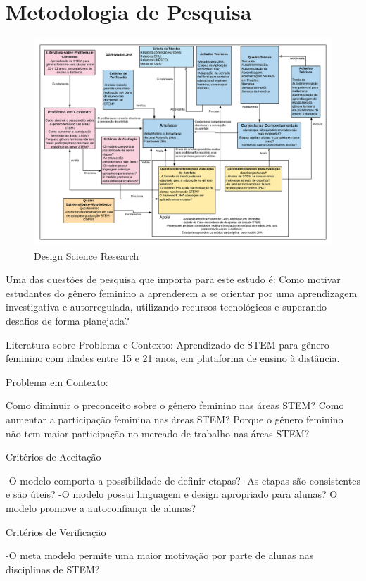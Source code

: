 \section{Metodologia de Pesquisa}

\begin{figure}
    \centering
    \includegraphics[width=.9\textwidth]{chaps/Images/DSRV2.png}
    \caption{Design Science Research}
    \label{fig:dsr}
\end{figure}

Uma das questões de pesquisa que importa para este estudo é: Como motivar estudantes do gênero feminino a aprenderem a se orientar por uma aprendizagem investigativa e autorregulada, utilizando recursos tecnológicos e superando desafios de forma planejada?

Literatura sobre Problema e Contexto:
Aprendizado de STEM para gênero feminino com idades entre 15 e 21 anos, em plataforma de ensino à distância.

Problema em Contexto:

Como diminuir o preconceito sobre o gênero feminino nas áreas STEM?
Como aumentar a participação feminina nas áreas STEM?
Porque o gênero feminino não tem maior participação no mercado de trabalho nas áreas STEM?

Critérios de Aceitação

-O modelo comporta a possibilidade de definir etapas?
-As etapas são consistentes e são úteis?
-O modelo possui linguagem e design apropriado para alunas? 
O modelo promove a autoconfiança de alunas?

Critérios de Verificação

-O meta modelo permite uma maior motivação por parte de alunas nas disciplinas de STEM?

